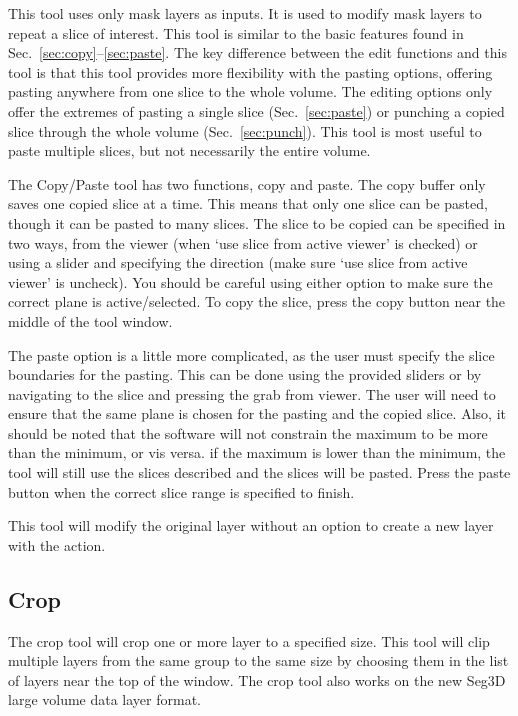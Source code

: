 \documentclass[fleqn,11pt,openany]{book}
\begin{document}
This tool uses only mask layers as inputs.  It is used to modify mask layers to repeat a slice of interest.  This tool is similar to the basic features found in Sec.~\ref{sec:copy}--\ref{sec:paste}.  The key difference between the edit functions and this tool is that this tool provides more flexibility with the pasting options, offering pasting anywhere from one slice to the whole volume.  The editing options only offer the extremes of pasting a single slice (Sec.~\ref{sec:paste}) or punching a copied slice through the whole volume (Sec.~\ref{sec:punch}).  This tool is most useful to paste multiple slices, but not necessarily the entire volume.  

The Copy/Paste tool has two functions, copy and paste.  The copy buffer only saves one copied slice at a time.  This means that only one slice can be pasted, though it can be pasted to many slices.  The slice to be copied can be specified in two ways, from the viewer (when `use slice from active viewer' is checked) or using a slider and specifying the direction (make sure `use slice from active viewer' is uncheck).  You should be careful using either option to make sure the correct plane is active/selected.  To copy the slice, press the copy button near the middle of the tool window.  

The paste option is a little more complicated, as the user must specify the slice boundaries for the pasting.  This can be done using the provided sliders or by navigating to the slice and pressing the grab from viewer.  The user will need to ensure that the same plane is chosen for the pasting and the copied slice.  Also, it should be noted that the software will not constrain the maximum to be more than the minimum, or vis versa.  if the maximum is lower than the minimum, the tool will still use the slices described and the slices will be pasted.  Press the paste button when the correct slice range is specified to finish.  

This tool will modify the original layer without an option to create a new layer with the action.  

\subsection{Crop}

The crop tool will crop one or more layer to a specified size. This tool will clip multiple layers from the same group to the same size  by choosing them in the list of layers near the top of the window. The crop tool also works on the new Seg3D large volume data layer format.
\end{document}
